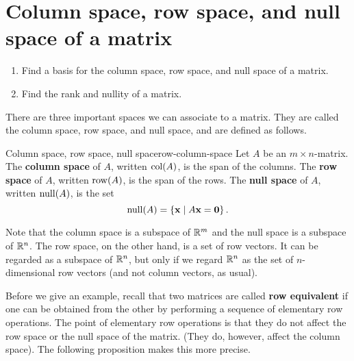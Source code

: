 \section{Column space, row space, and null space of a matrix}
\label{sec:null-space}

\begin{outcome}
  \begin{enumerate}
  \item Find a basis for the column space, row space, and null space
    of a matrix.
  \item Find the rank and nullity of a matrix.
  \end{enumerate}
\end{outcome}

There are three important spaces we can associate to a matrix. They
are called the column space, row space, and null space, and are
defined as follows.

\begin{definition}{Column space, row space, null space}{row-column-space}
  Let $A$ be an $m\times n$-matrix.  The \textbf{column space}%
   of $A$, written $\col(A)$, is the span
  of the columns. The \textbf{row space}%
   of $A$, written $\row(A)$, is the span of
  the rows.  The \textbf{null space}%
   of $A$, written $\nullspace(A)$, is the
  set
  \begin{equation*}
    \nullspace(A) =\set{\vect{x} \mid A \vect{x} =\vect{0}}.
  \end{equation*}
\end{definition}

Note that the column space is a subspace of $\mathbb{R}^m$ and the null space
is a subspace of $\mathbb{R}^n$. The row space, on the other hand, is a set of
row vectors. It can be regarded as a subspace of $\mathbb{R}^n$, but only if
we regard $\mathbb{R}^n$ as the set of $n$-dimensional row vectors (and not
column vectors, as usual).

Before we give an example, recall that two matrices are called
\textbf{row equivalent}%
%
 if one can be obtained from the other by
performing a sequence of elementary row operations. The point of
elementary row operations is that they do not affect the row space or
the null space of the matrix. (They do, however, affect the column
space). The following proposition makes this more precise.

